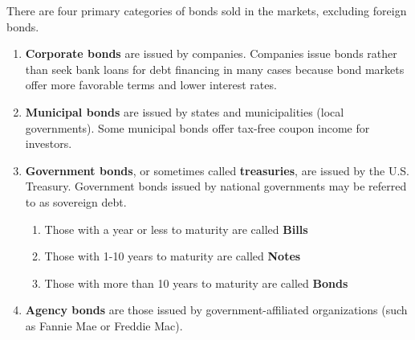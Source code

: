 \documentclass{article}
\begin{document}
  \begin{definition}
    There are four primary categories of bonds sold in the markets, excluding foreign bonds. 
    \begin{enumerate}
      \item \textbf{Corporate bonds} are issued by companies. Companies issue bonds rather than seek bank loans for debt financing in many cases because bond markets offer more favorable terms and lower interest rates.
      \item \textbf{Municipal bonds} are issued by states and municipalities (local governments). Some municipal bonds offer tax-free coupon income for investors. 
      \item \textbf{Government bonds}, or sometimes called \textbf{treasuries}, are issued by the U.S. Treasury. Government bonds issued by national governments may be referred to as sovereign debt. 
      \begin{enumerate}
          \item Those with a year or less to maturity are called \textbf{Bills}
          \item Those with 1-10 years to maturity are called \textbf{Notes}
          \item Those with more than 10 years to maturity are called \textbf{Bonds}
      \end{enumerate}
      \item \textbf{Agency bonds} are those issued by government-affiliated organizations (such as Fannie Mae or Freddie Mac). 
    \end{enumerate}
  \end{definition}
\end{document}
